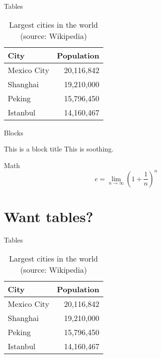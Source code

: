 \documentclass{beamer}
\begin{document}
\begin{frame}{Tables}
  \begin{table}
    \caption{Largest cities in the world (source: Wikipedia)}
    \begin{tabular}{lr}
      \toprule
      City & Population\\
      \midrule
      Mexico City & 20,116,842\\
      Shanghai & 19,210,000\\
      Peking & 15,796,450\\
      Istanbul & 14,160,467\\
      \bottomrule
    \end{tabular}
  \end{table}
\end{frame}
\begin{frame}{Blocks}

  \begin{block}{This is a block title}
    This is soothing.
  \end{block}

\end{frame}
\begin{frame}{Math}
  \begin{equation*}
    e = \lim_{n\to \infty} \left(1 + \frac{1}{n}\right)^n
  \end{equation*}
\end{frame}

\section{Want tables?}

\begin{frame}{Tables}
  \begin{table}
    \caption{Largest cities in the world (source: Wikipedia)}
    \begin{tabular}{lr}
      \toprule
      City & Population\\
      \midrule
      Mexico City & 20,116,842\\
      Shanghai & 19,210,000\\
      Peking & 15,796,450\\
      Istanbul & 14,160,467\\
      \bottomrule
    \end{tabular}
  \end{table}
\end{frame}
\end{document}
